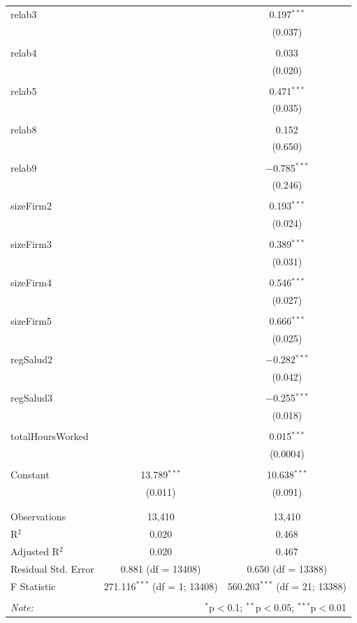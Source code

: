 \begin{table}[!htbp]
\begin{tabular}{@{\extracolsep{5pt}}lcc}
 relab3 &  & 0.197$^{***}$ \\ 
  &  & (0.037) \\ 
  & & \\ 
 relab4 &  & 0.033 \\ 
  &  & (0.020) \\ 
  & & \\ 
 relab5 &  & 0.471$^{***}$ \\ 
  &  & (0.035) \\ 
  & & \\ 
 relab8 &  & 0.152 \\ 
  &  & (0.650) \\ 
  & & \\ 
 relab9 &  & $-$0.785$^{***}$ \\ 
  &  & (0.246) \\ 
  & & \\ 
 sizeFirm2 &  & 0.193$^{***}$ \\ 
  &  & (0.024) \\ 
  & & \\ 
 sizeFirm3 &  & 0.389$^{***}$ \\ 
  &  & (0.031) \\ 
  & & \\ 
 sizeFirm4 &  & 0.546$^{***}$ \\ 
  &  & (0.027) \\ 
  & & \\ 
 sizeFirm5 &  & 0.666$^{***}$ \\ 
  &  & (0.025) \\ 
  & & \\ 
 regSalud2 &  & $-$0.282$^{***}$ \\ 
  &  & (0.042) \\ 
  & & \\ 
 regSalud3 &  & $-$0.255$^{***}$ \\ 
  &  & (0.018) \\ 
  & & \\ 
 totalHoursWorked &  & 0.015$^{***}$ \\ 
  &  & (0.0004) \\ 
  & & \\ 
 Constant & 13.789$^{***}$ & 10.638$^{***}$ \\ 
  & (0.011) & (0.091) \\ 
  & & \\ 
\hline \\[-1.8ex] 
Observations & 13,410 & 13,410 \\ 
R$^{2}$ & 0.020 & 0.468 \\ 
Adjusted R$^{2}$ & 0.020 & 0.467 \\ 
Residual Std. Error & 0.881 (df = 13408) & 0.650 (df = 13388) \\ 
F Statistic & 271.116$^{***}$ (df = 1; 13408) & 560.203$^{***}$ (df = 21; 13388) \\ 
\hline 
\hline \\[-1.8ex] 
\textit{Note:}  & \multicolumn{2}{r}{$^{*}$p$<$0.1; $^{**}$p$<$0.05; $^{***}$p$<$0.01} \\ 
\end{tabular} 
\end{table} 
